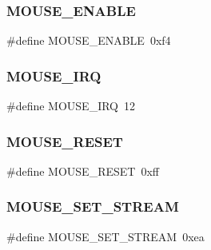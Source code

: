 \hypertarget{group__i8042_ga4e6aa8d10e05b5f94c196bfe2cdfb8d7}{}\label{group__i8042_ga4e6aa8d10e05b5f94c196bfe2cdfb8d7} 
\subsubsection{\texorpdfstring{M\+O\+U\+S\+E\+\_\+\+E\+N\+A\+B\+LE}{MOUSE\_ENABLE}}
{\footnotesize\ttfamily \#define M\+O\+U\+S\+E\+\_\+\+E\+N\+A\+B\+LE~0xf4}

\hypertarget{group__i8042_ga85964cb90343bb1a029b1d1b4229f910}{}\label{group__i8042_ga85964cb90343bb1a029b1d1b4229f910} 
\subsubsection{\texorpdfstring{M\+O\+U\+S\+E\+\_\+\+I\+RQ}{MOUSE\_IRQ}}
{\footnotesize\ttfamily \#define M\+O\+U\+S\+E\+\_\+\+I\+RQ~12}

\hypertarget{group__i8042_ga6b902000c4f0a66e57f0eb78d7611105}{}\label{group__i8042_ga6b902000c4f0a66e57f0eb78d7611105} 
\subsubsection{\texorpdfstring{M\+O\+U\+S\+E\+\_\+\+R\+E\+S\+ET}{MOUSE\_RESET}}
{\footnotesize\ttfamily \#define M\+O\+U\+S\+E\+\_\+\+R\+E\+S\+ET~0xff}

\hypertarget{group__i8042_gafcda52e19d0d6e3053ec9e51c548254d}{}\label{group__i8042_gafcda52e19d0d6e3053ec9e51c548254d} 
\subsubsection{\texorpdfstring{M\+O\+U\+S\+E\+\_\+\+S\+E\+T\+\_\+\+S\+T\+R\+E\+AM}{MOUSE\_SET\_STREAM}}
{\footnotesize\ttfamily \#define M\+O\+U\+S\+E\+\_\+\+S\+E\+T\+\_\+\+S\+T\+R\+E\+AM~0xea}

